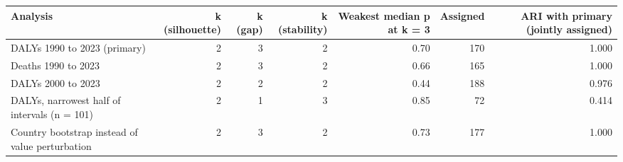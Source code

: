 \begin{tabular}{lrrrrrr}
\toprule
Analysis & k (silhouette) & k (gap) & k (stability) & Weakest median p at k = 3 & Assigned & ARI with primary (jointly assigned) \\
\midrule
DALYs 1990 to 2023 (primary) & 2 & 3 & 2 & 0.70 & 170 & 1.000 \\
Deaths 1990 to 2023 & 2 & 3 & 2 & 0.66 & 165 & 1.000 \\
DALYs 2000 to 2023 & 2 & 2 & 2 & 0.44 & 188 & 0.976 \\
DALYs, narrowest half of intervals (n = 101) & 2 & 1 & 3 & 0.85 &  72 & 0.414 \\
Country bootstrap instead of value perturbation & 2 & 3 & 2 & 0.73 & 177 & 1.000 \\
\bottomrule
\end{tabular}
